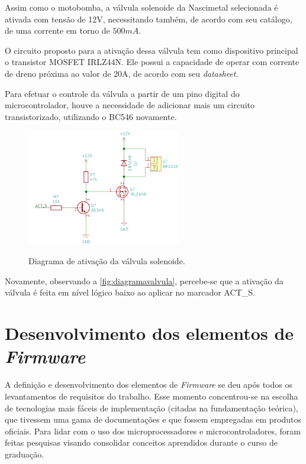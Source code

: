 Assim como o motobomba, a válvula solenoide da Nascimetal selecionada é ativada com tensão de 12V, necessitando também, de acordo com seu catálogo, de uma corrente em torno de $500mA$.

O circuito proposto para a ativação dessa válvula tem como dispositivo principal o transistor MOSFET IRLZ44N. Ele possui a capacidade de operar com corrente de dreno próxima ao valor de 20A, de acordo com seu \textit{datasheet}.

Para efetuar o controle da válvula a partir de um pino digital do microcontrolador, houve a necessidade de adicionar mais um circuito transistorizado, utilizando o BC546 novamente.


\begin{figure}[H]
	\centering
	\caption{Diagrama de ativação da válvula solenoide.}
	\includegraphics[width=0.6\textwidth]{figuras/ativa_valvula.png}
	\label{fig:diagramavalvula}
\end{figure} 

 Novamente, observando a \autoref{fig:diagramavalvula}, percebe-se que a ativação da válvula é feita em nível lógico baixo ao aplicar no marcador ACT\_S.

\section{Desenvolvimento dos elementos de \textit{Firmware}}
\label{sec: dev_ele_fw}

A definição e desenvolvimento dos elementos de \textit{Firmware} se deu após todos os levantamentos de requisitos do trabalho. Esse momento concentrou-se na escolha de tecnologias mais fáceis de implementação (citadas na fundamentação teórica), que tivessem uma gama de documentações e que fossem empregadas em produtos oficiais. Para lidar com o uso dos microprocessadores e microcontroladores, foram feitas pesquisas visando consolidar conceitos aprendidos durante o curso de graduação.

